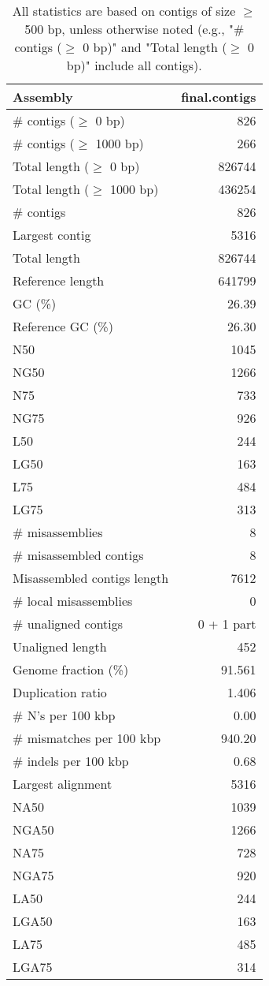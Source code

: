 \documentclass[12pt,a4paper]{article}
\begin{document}
\begin{table}[ht]
\begin{center}
\caption{All statistics are based on contigs of size $\geq$ 500 bp, unless otherwise noted (e.g., "\# contigs ($\geq$ 0 bp)" and "Total length ($\geq$ 0 bp)" include all contigs).}
\begin{tabular}{|l*{1}{|r}|}
\hline
Assembly & final.contigs \\ \hline
\# contigs ($\geq$ 0 bp) & 826 \\ \hline
\# contigs ($\geq$ 1000 bp) & 266 \\ \hline
Total length ($\geq$ 0 bp) & 826744 \\ \hline
Total length ($\geq$ 1000 bp) & 436254 \\ \hline
\# contigs & 826 \\ \hline
Largest contig & 5316 \\ \hline
Total length & 826744 \\ \hline
Reference length & 641799 \\ \hline
GC (\%) & 26.39 \\ \hline
Reference GC (\%) & 26.30 \\ \hline
N50 & 1045 \\ \hline
NG50 & 1266 \\ \hline
N75 & 733 \\ \hline
NG75 & 926 \\ \hline
L50 & 244 \\ \hline
LG50 & 163 \\ \hline
L75 & 484 \\ \hline
LG75 & 313 \\ \hline
\# misassemblies & 8 \\ \hline
\# misassembled contigs & 8 \\ \hline
Misassembled contigs length & 7612 \\ \hline
\# local misassemblies & 0 \\ \hline
\# unaligned contigs & 0 + 1 part \\ \hline
Unaligned length & 452 \\ \hline
Genome fraction (\%) & 91.561 \\ \hline
Duplication ratio & 1.406 \\ \hline
\# N's per 100 kbp & 0.00 \\ \hline
\# mismatches per 100 kbp & 940.20 \\ \hline
\# indels per 100 kbp & 0.68 \\ \hline
Largest alignment & 5316 \\ \hline
NA50 & 1039 \\ \hline
NGA50 & 1266 \\ \hline
NA75 & 728 \\ \hline
NGA75 & 920 \\ \hline
LA50 & 244 \\ \hline
LGA50 & 163 \\ \hline
LA75 & 485 \\ \hline
LGA75 & 314 \\ \hline
\end{tabular}
\end{center}
\end{table}
\end{document}
